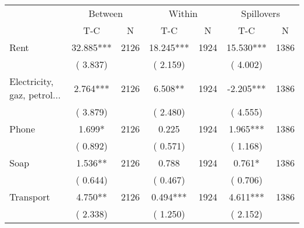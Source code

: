
\begin{tabular}{l*{6}{c}}\hline&\multicolumn{2}{c}{Between}&\multicolumn{2}{c}{Within}&\multicolumn{2}{c}{Spillovers} \\ \cmidrule(r){2-3}\cmidrule(l){4-5}\cmidrule(l){6-7} & {T-C} & {N} & {T-C} & {N}  & {T-C}  & {N}  \\ \midrule
Rent        &             32.885***      &       2126       &             18.245***      &       1924       &             15.530***      &       1386       \\
                       &       (       3.837)            &                               &       (       2.159)            &                               &       (       4.002)            &                               \\
Electricity, gaz, petrol...        &              2.764***      &       2126       &              6.508**      &       1924       &             -2.205***      &       1386       \\
                       &       (       3.879)            &                               &       (       2.480)            &                               &       (       4.555)            &                               \\
Phone        &              1.699*      &       2126       &              0.225      &       1924       &              1.965***      &       1386       \\
                       &       (       0.892)            &                               &       (       0.571)            &                               &       (       1.168)            &                               \\
Soap        &              1.536**      &       2126       &              0.788      &       1924       &              0.761*      &       1386       \\
                       &       (       0.644)            &                               &       (       0.467)            &                               &       (       0.706)            &                               \\
Transport        &              4.750**      &       2126       &              0.494***      &       1924       &              4.611***      &       1386       \\
                       &       (       2.338)            &                               &       (       1.250)            &                               &       (       2.152)            &                               \\

\end{tabular}
